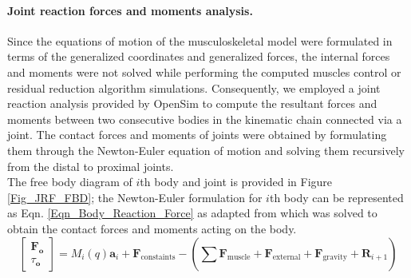 \documentclass[10pt,letterpaper]{article}
\begin{document}
\paragraph{Joint reaction forces and moments analysis.} Since the equations of motion of the musculoskeletal model were formulated in terms of the generalized coordinates and generalized forces, the internal forces and moments were not solved while performing the computed muscles control or residual reduction algorithm simulations. Consequently, we employed a joint reaction analysis provided by OpenSim to compute the resultant forces and moments between two consecutive bodies in the kinematic chain connected via a joint. The contact forces and moments of joints were obtained by formulating them through the Newton-Euler equation of motion and solving them recursively from the distal to proximal joints.\\
The free body diagram of $i$th body and joint is provided in Figure \ref{Fig_JRF_FBD}; the Newton-Euler formulation for $i$th body can be represented as Eqn. \eqref{Eqn_Body_Reaction_Force} as adapted from \cite{151} which was solved to obtain the contact forces and moments acting on the body.
\begin{equation}\label{Eqn_Body_Reaction_Force}
\left\lbrack \begin{array}{c}
{\mathit{\mathbf{F}}}_{\mathit{\mathbf{o}}} \\
\tau_{\mathit{\mathbf{o}}} 
\end{array}\right\rbrack =M_i \left(q\right){\mathit{\mathbf{a}}}_i +{\mathit{\mathbf{F}}}_{\mathrm{c}\mathrm{o}\mathrm{n}\mathrm{s}\mathrm{t}\mathrm{a}\mathrm{i}\mathrm{n}\mathrm{t}\mathrm{s}} -\left(\sum_{\;}^{\;} {\mathit{\mathbf{F}}}_{\mathrm{m}\mathrm{u}\mathrm{s}\mathrm{c}\mathrm{l}\mathrm{e}} +{\mathit{\mathbf{F}}}_{\mathrm{e}\mathrm{x}\mathrm{t}\mathrm{e}\mathrm{r}\mathrm{n}\mathrm{a}\mathrm{l}} +{\mathit{\mathbf{F}}}_{\mathrm{g}\mathrm{r}\mathrm{a}\mathrm{v}\mathrm{i}\mathrm{t}\mathrm{y}} +{\mathit{\mathbf{R}}}_{i+1} \right)
\end{equation}
\end{document}
